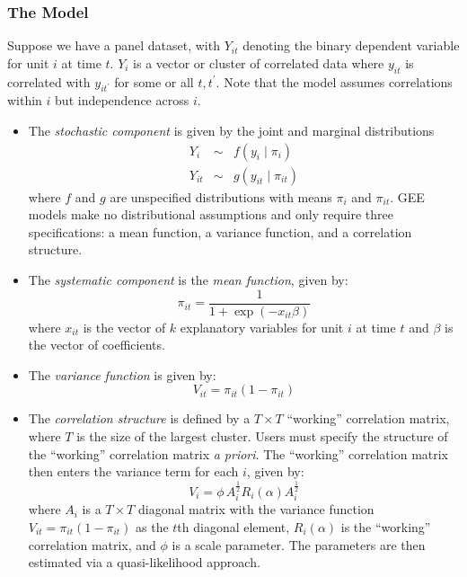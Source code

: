 \subsubsection{The Model}
Suppose we have a panel dataset, with $Y_{it}$ denoting the binary dependent variable for unit $i$ at time $t$.  $Y_{i}$ is a vector or cluster of correlated data
where $y_{it}$ is correlated with $y_{it^\prime}$ for some or all
$t, t^\prime$.  Note that the model assumes correlations within $i$ but independence across $i$.  

\begin{itemize}

\item The \emph{stochastic component} is given by the joint and marginal distributions
\begin{eqnarray*}
Y_{i} &\sim& f(y_{i} \mid \pi_{i})\\
Y_{it} &\sim& g(y_{it} \mid \pi_{it})
\end{eqnarray*}
where $f$ and $g$ are unspecified distributions with means $\pi_{i}$ and $\pi_{it}$.  GEE models make no distributional assumptions and only require three specifications: a mean function, a variance function, and a correlation structure.

\item The \emph{systematic component} is the \textit{mean function}, given by:
\begin{equation*}
\pi_{it} = \frac{1}{1 + \exp(-x_{it} \beta)}
\end{equation*}
where  $x_{it}$ is the vector of $k$ explanatory variables for unit $i$ at time $t$
and $\beta$ is the vector of coefficients.

\item The \textit{variance function} is given by: 
\begin{equation*}
V_{it} = \pi_{it} (1-\pi_{it})
\end{equation*} 

\item The \textit{correlation structure} is defined by a $T \times T$ ``working'' correlation matrix, where $T$ is the size of the largest cluster.  Users must specify the structure of the ``working'' correlation matrix \textit{a priori}.  The ``working'' correlation matrix then enters the variance term for each $i$, given by:
\begin{equation*}
V_{i} = \phi \, A_{i}^{\frac{1}{2}} R_{i}(\alpha) A_{i}^{\frac{1}{2}}
\end{equation*}
where $A_{i}$ is a $T \times T$ diagonal matrix with the variance function $V_{it} = \pi_{it} (1-\pi_{it})$ as the $t$th diagonal element, $R_{i}(\alpha)$ is the ``working'' correlation matrix, and $\phi$ is a scale parameter.  The parameters are then estimated via a quasi-likelihood approach.


\end{itemize}
